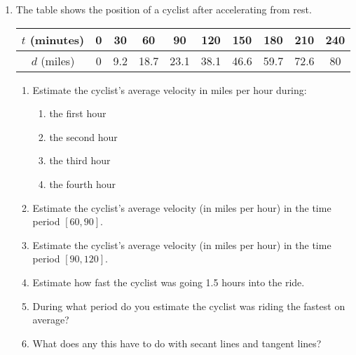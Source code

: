\documentclass[11pt,fleqn]{article}
\begin{document}
\begin{enumerate}
\item The table shows the position of a cyclist after accelerating from rest.\\

\begin{tabular}{|c||c|c|c|c|c|c|c|c|c|}
$t$ (minutes) &0&30&60&90&120&150&180&210&240\\
\hline
$d$ (miles) &0&9.2&18.7&23.1&38.1&46.6&59.7&72.6&80\\
\end{tabular}
\begin{enumerate}
\item Estimate the cyclist's average velocity in miles per hour  during:
\begin{enumerate}
\item the first hour\\ \vfill
\item the second hour\\ \vfill
\item the third hour\\ \vfill
\item the fourth hour\\ \vfill
\end{enumerate}
\item Estimate the cyclist's average velocity (in miles per hour) in the time period $[60,90]$.\\  \vfill
\item Estimate the cyclist's average velocity (in miles per hour) in the time period $[90,120]$.\\  \vfill
\item Estimate how fast the cyclist was going 1.5 hours into the ride.\\  \vfill
\item During what period do you estimate the cyclist was riding the fastest on average?\\ \vfill
\item What does any this have to do with secant lines and tangent lines?
\end{enumerate}
%

\end{enumerate}
\end{document}

